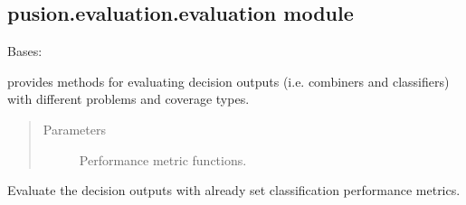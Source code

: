 \documentclass[letterpaper,10pt,english]{sphinxmanual}
\begin{document}
\subsection{pusion.evaluation.evaluation module}
\label{\detokenize{pusion.evaluation.evaluation:module-pusion.evaluation.evaluation}}\label{\detokenize{pusion.evaluation.evaluation:pusion-evaluation-evaluation-module}}\label{\detokenize{pusion.evaluation.evaluation:eval-cref}}\label{\detokenize{pusion.evaluation.evaluation::doc}}

\begin{fulllineitems}
\label{\detokenize{pusion.evaluation.evaluation:pusion.evaluation.evaluation.Evaluation}}
\sphinxAtStartPar
Bases: 

\sphinxAtStartPar
{\hyperref[\detokenize{pusion.evaluation.evaluation:pusion.evaluation.evaluation.Evaluation}]{}} provides methods for evaluating decision outputs (i.e. combiners and classifiers) with different
problems and coverage types.
\begin{quote}\begin{description}
\item[{Parameters}] \leavevmode
\sphinxAtStartPar
{} \textendash{} Performance metric functions.

\end{description}\end{quote}

\begin{fulllineitems}
\label{\detokenize{pusion.evaluation.evaluation:pusion.evaluation.evaluation.Evaluation.evaluate}}
\sphinxAtStartPar
Evaluate the decision outputs with already set classification performance metrics.


\end{fulllineitems}
\end{fulllineitems}
\end{document}
